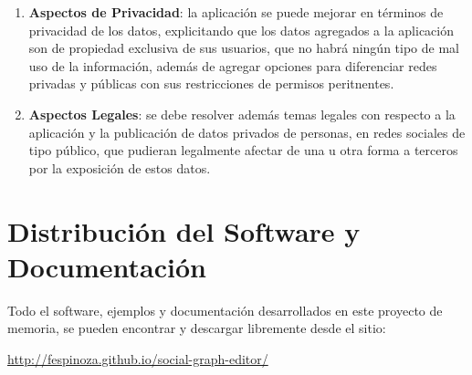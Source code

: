 \begin{enumerate}
    \item \textbf{Aspectos de Privacidad}: la aplicación se puede mejorar en términos de privacidad de los datos, explicitando que los datos agregados a la aplicación son de propiedad exclusiva de sus usuarios, que no habrá ningún tipo de mal uso de la información, además de agregar opciones para diferenciar redes privadas y públicas con sus restricciones de permisos peritnentes.
    
    \item \textbf{Aspectos Legales}: se debe resolver además temas legales con respecto a la aplicación y la publicación de datos privados de personas, en redes sociales de tipo público, que pudieran legalmente afectar de una u otra forma a terceros por la exposición de estos datos.
  \end{enumerate}


\section{Distribución del Software y Documentación} %
\label{sec:distribucion_del_software_y_documentacion}

Todo el software, ejemplos y documentación desarrollados en este proyecto de memoria, se pueden encontrar y descargar libremente desde el sitio:\\

\begin{center}
  \url{http://fespinoza.github.io/social-graph-editor/}
\end{center}

